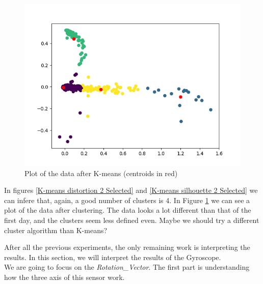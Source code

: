 \documentclass[idxtotoc,hyperref,openany]{labbook} %
\begin{document}
\begin{figure}[h]
\includegraphics[width=0.9\linewidth]{KMeans_Plot_Accelerometer_Day2_Selected.png}
\setlength\belowcaptionskip{-10pt}
\caption{Plot of the data after K-means (centroids in red)}
\label{K-Means plot 2 Selected}
\end{figure}

In figures \ref{K-means distortion 2 Selected} and \ref{K-means silhouette 2 Selected} we can infere that, again, a good number of clusters is 4. In Figure \ref{K-Means plot 2 Selected} we can see a plot of the data after clustering. The data looks a lot different than that of the first day, and the clusters seem less defined even. Maybe we should try a different cluster algorithm than K-means?



After all the previous experiments, the only remaining work is interpreting the results. In this section, we will interpret the results of the Gyroscope. \\
We are going to focus on the \textit{Rotation\_Vector}. The first part is understanding how the three axis of this sensor work.
\end{document}
